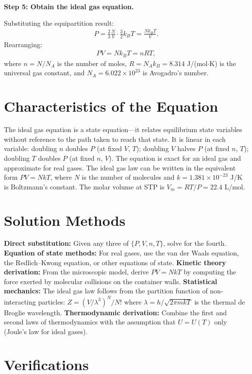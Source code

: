 \textbf{Step 5: Obtain the ideal gas equation.}

Substituting the equipartition result:
\begin{align}
P = \frac{2}{3}\frac{N}{V}\cdot\frac{3}{2}k_BT = \frac{Nk_BT}{V}.
\end{align}
Rearranging:
\begin{align}
\boxed{PV = Nk_BT = nRT,}
\end{align}
where $n = N/N_A$ is the number of moles, $R = N_Ak_B = 8.314$ J/(mol$\cdot$K) is the universal gas constant, and $N_A = 6.022\times 10^{23}$ is Avogadro's number.

\section*{Characteristics of the Equation}

The ideal gas equation is a state equation---it relates equilibrium state variables without reference to the path taken to reach that state. It is linear in each variable: doubling $n$ doubles $P$ (at fixed $V$, $T$); doubling $V$ halves $P$ (at fixed $n$, $T$); doubling $T$ doubles $P$ (at fixed $n$, $V$). The equation is exact for an ideal gas and approximate for real gases. The ideal gas law can be written in the equivalent form $PV = NkT$, where $N$ is the number of molecules and $k = 1.381 \times 10^{-23}$ J/K is Boltzmann's constant. The molar volume at STP is $V_m = RT/P = 22.4$ L/mol.
\section*{Solution Methods}

\textbf{Direct substitution:} Given any three of $\{P, V, n, T\}$, solve for the fourth. \textbf{Equation of state methods:} For real gases, use the van der Waals equation, the Redlich--Kwong equation, or other equations of state. \textbf{Kinetic theory derivation:} From the microscopic model, derive $PV = NkT$ by computing the force exerted by molecular collisions on the container walls. \textbf{Statistical mechanics:} The ideal gas law follows from the partition function of non-interacting particles: $Z = (V/\lambda^3)^N/N!$ where $\lambda = h/\sqrt{2\pi mkT}$ is the thermal de Broglie wavelength. \textbf{Thermodynamic derivation:} Combine the first and second laws of thermodynamics with the assumption that $U = U(T)$ only (Joule's law for ideal gases).
\section*{Verifications}

